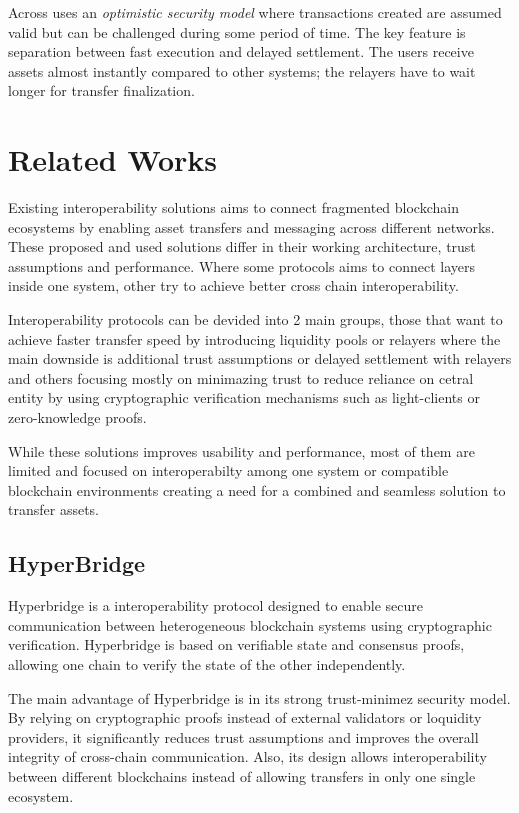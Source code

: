 \documentclass[conference]{IEEEtran}
\begin{document}
Across uses an\textit{ optimistic security model } where transactions created are assumed valid but can be challenged during some period of time. The key feature is separation between fast execution and delayed settlement. The users receive assets almost instantly compared to other systems; the relayers have to wait longer for transfer finalization. 




\section{Related Works}

Existing interoperability solutions aims to connect fragmented blockchain ecosystems by enabling asset transfers and messaging across different networks. These proposed and used solutions differ in their working architecture, trust assumptions and performance. Where some protocols aims to connect layers inside one system, other try to achieve better cross chain interoperability.

Interoperability protocols can be devided into 2 main groups, those that want to achieve faster transfer speed by introducing liquidity pools or relayers where the main downside is additional trust assumptions or delayed settlement with relayers and others focusing mostly on minimazing trust to reduce reliance on cetral entity by using cryptographic verification mechanisms such as light-clients or zero-knowledge proofs.


While these solutions improves usability and performance, most of them are limited and focused on interoperabilty among one system or compatible blockchain environments creating a need for a combined and seamless solution to transfer assets.


\subsection{HyperBridge}

Hyperbridge is a interoperability protocol designed to enable secure communication between heterogeneous blockchain systems using cryptographic verification. Hyperbridge is based on verifiable state and consensus proofs, allowing one chain to verify the state of the other independently. 

The main advantage of Hyperbridge is in its strong trust-minimez security model. By relying on cryptographic proofs instead of external validators or loquidity providers, it significantly reduces trust assumptions and improves the overall integrity of cross-chain communication. Also, its design allows interoperability between different blockchains instead of allowing transfers in only one single ecosystem.
\end{document}
